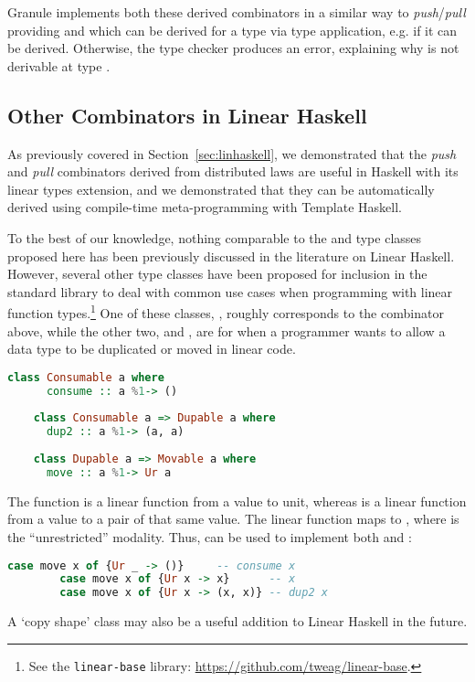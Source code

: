 Granule implements both these derived combinators in a similar
way to \emph{push}/\emph{pull} providing 
and  which can be derived for a type  via type
application, e.g.  if it can be derived.
Otherwise, the type checker produces an error,
explaining why  is not derivable at type .

\subsection{Other Combinators in Linear Haskell}

As previously covered in Section~\ref{sec:linhaskell}, we demonstrated that the
\emph{push} and \emph{pull} combinators derived from distributed laws are useful
in Haskell with its linear types extension, and we demonstrated that they can be
automatically derived using compile-time meta-programming with Template Haskell.

To the best of our knowledge, nothing comparable to the  and
 type classes proposed here has been previously discussed in
the literature on Linear Haskell. However, several other type classes have been
proposed for inclusion in the standard library to deal with common use cases
when programming with linear function types.\footnote{See the
\texttt{linear-base} library: \url{https://github.com/tweag/linear-base}.} One
of these classes, , roughly corresponds to the
 combinator above, while the other two,  and
, are for when a programmer wants to allow a data type to be
duplicated or moved in linear code.

\begin{lstlisting}[language=Haskell]
    class Consumable a where
      consume :: a %1-> ()
    
    class Consumable a => Dupable a where
      dup2 :: a %1-> (a, a)
    
    class Dupable a => Movable a where
      move :: a %1-> Ur a
    \end{lstlisting}

    The  function is a linear function from a value to unit,
    whereas  is a linear function from a value to a pair of that
    same value. The  linear function maps  to
    , where  is the ``unrestricted'' modality.
    Thus,  can be used to implement both  and :
    \begin{lstlisting}[language=Haskell]
        case move x of {Ur _ -> ()}     -- consume x
        case move x of {Ur x -> x}      -- x
        case move x of {Ur x -> (x, x)} -- dup2 x
        \end{lstlisting}
        A `copy shape' class may also be a useful addition to Linear
        Haskell in the future.